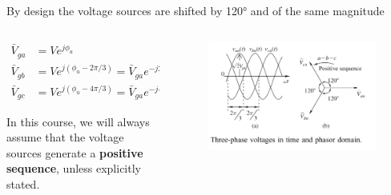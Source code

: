 \begin{frame}{By design the voltage sources are shifted by 120° and of the same magnitude}
    \begin{columns}
    \begin{column}{0.4\textwidth}
        \begin{align*}
        \bar{V}_{ga} &= V e^{j\phi_u} \\
        \bar{V}_{gb} &= V e^{j(\phi_u - 2 \pi / 3)} = \bar{V}_{ga} e^{-j 2 \pi / 3} \\
        \bar{V}_{gc} &= V e^{j(\phi_u - 4 \pi / 3)} = \bar{V}_{ga} e^{-j 4 \pi / 3}
        \end{align*}

    {\scriptsize In this course, we will always assume that the voltage sources generate a \textbf{positive sequence}, unless explicitly stated.}

    \end{column}
    \begin{column}{0.6\textwidth}
        \begin{figure}
            \centering
            \includegraphics[width=0.99\textwidth]{images/3ph_time_vs_phasor.PNG}
        \end{figure}
    \end{column}
\end{columns}

\end{frame}

